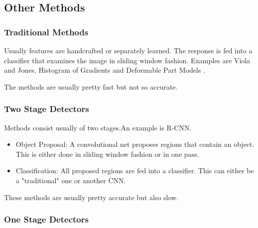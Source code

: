 \documentclass{article}
\begin{document}
\subsection{Other Methods}

\subsubsection{Traditional Methods}

Usually features are handcrafted or separately learned. The response is fed into a classifier that examines the image in sliding window fashion. Examples are Viola and Jones, Histogram of Gradients and Deformable Part Models \cite{Felzenszwalb,Forsyth,Viola2004}.

The methods are usually pretty fast but not so accurate.

\subsubsection{Two Stage Detectors}

Methods consist usually of two stages.An example is R-CNN\cite{Ren}. 
\begin{itemize}
	\item Object Proposal: A convolutional net proposes regions that contain an object. This is either done in sliding window fashion or in one pass.
	\item Classification: All proposed regions are fed into a classifier. This can either be a "traditional" one or another CNN.
\end{itemize}
These methods are usually pretty accurate but also slow.
\subsubsection{One Stage Detectors}
\end{document}
